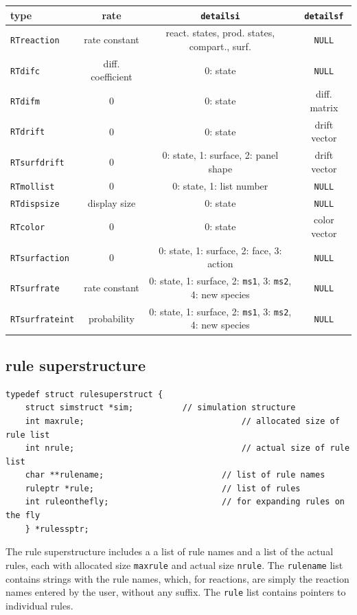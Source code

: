 \documentclass {scrbook}
\newcommand {\ttt} {\texttt}
\begin{document}
\begin{longtable}[c]{lccc}
type&rate&\ttt{detailsi}&\ttt{detailsf}\\
\hline
\ttt{RTreaction}&rate constant&react. states, prod. states, compart., surf.&\ttt{NULL}\\
\ttt{RTdifc}&diff. coefficient&0: state&\ttt{NULL}\\
\ttt{RTdifm}&0&0: state&diff. matrix\\
\ttt{RTdrift}&0&0: state&drift vector\\
\ttt{RTsurfdrift}&0&0: state, 1: surface, 2: panel shape&drift vector\\
\ttt{RTmollist}&0&0: state, 1: list number&\ttt{NULL}\\
\ttt{RTdispsize}&display size&0: state&\ttt{NULL}\\
\ttt{RTcolor}&0&0: state&color vector\\
\ttt{RTsurfaction}&0&0: state, 1: surface, 2: face, 3: action&\ttt{NULL}\\
\ttt{RTsurfrate}&rate constant&0: state, 1: surface, 2: \ttt{ms1}, 3: \ttt{ms2}, 4: new species&\ttt{NULL}\\
\ttt{RTsurfrateint}&probability&0: state, 1: surface, 2: \ttt{ms1}, 3: \ttt{ms2}, 4: new species&\ttt{NULL}\\

\end{longtable}


\subsection{rule superstructure}

\begin{lstlisting}
typedef struct rulesuperstruct {
	struct simstruct *sim;			// simulation structure
	int maxrule;								// allocated size of rule list
	int nrule;									// actual size of rule list
	char **rulename;						// list of rule names
	ruleptr *rule;							// list of rules
	int ruleonthefly;						// for expanding rules on the fly
	} *rulessptr;
\end{lstlisting}

The rule superstructure includes a a list of rule names and a list of the actual rules, each with allocated size \ttt{maxrule} and actual size \ttt{nrule}. The \ttt{rulename} list contains strings with the rule names, which, for reactions, are simply the reaction names entered by the user, without any suffix. The \ttt{rule} list contains pointers to individual rules.
\end{document}
